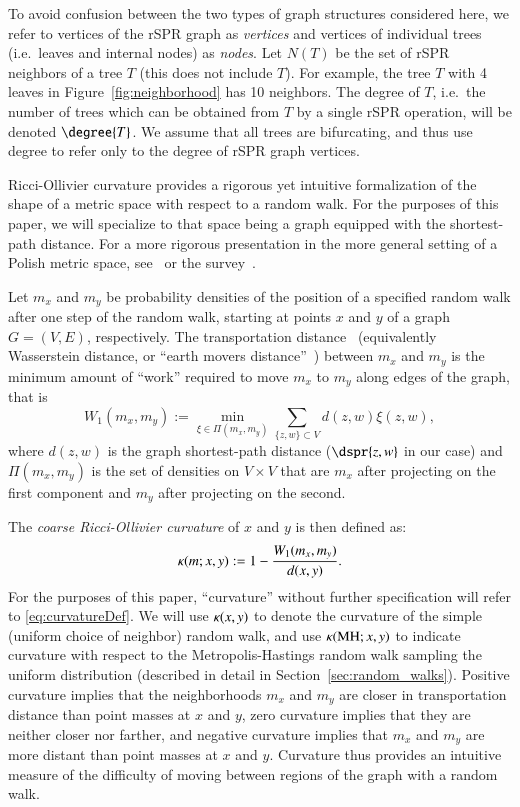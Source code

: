 \documentclass[]{elsarticle}
\newcommand{\MH}{\operatorname{MH}}
\newcommand{\curvature}[2][]{%
    \ifthenelse{\equal{#1}{}}%
		{\kappa(#2)}%
		{\kappa_{#1}(#2)}%
}
\begin{document}
To avoid confusion between the two types of graph structures considered here, we refer to vertices of the rSPR graph as \emph{vertices} and vertices of individual trees (i.e.\ leaves and internal nodes) as \emph{nodes}.
Let $N(T)$ be the set of rSPR neighbors of a tree $T$ (this does not include $T$).
For example, the tree $T$ with 4 leaves in Figure~\ref{fig:neighborhood} has 10 neighbors.
The degree of $T$, i.e.\ the number of trees which can be obtained from $T$ by a single rSPR operation, will be denoted $\degree{T}$.
We assume that all trees are bifurcating, and thus use degree to refer only to the degree of rSPR graph vertices.

Ricci-Ollivier curvature provides a rigorous yet intuitive formalization of the shape of a metric space with respect to a random walk.
For the purposes of this paper, we will specialize to that space being a graph equipped with the shortest-path distance.
For a more rigorous presentation in the more general setting of a Polish metric space, see~\citep{Ollivier2009-bw} or the survey~\citep{Ollivier2010-ao}.

Let $m_x$ and $m_y$ be probability densities of the position of a specified random walk after one step of the random walk, starting at points $x$ and $y$ of a graph $G = (V,E)$, respectively.
The transportation distance~\citep{Villani2003-wv} (equivalently Wasserstein distance, or ``earth movers distance''~\citep{rubner2000earth}) between $m_x$ and $m_y$ is the minimum amount of ``work'' required to move $m_x$ to $m_y$ along edges of the graph, that is
\vspace{-0.5em}
\begin{equation}
W_1(m_x, m_y) := \min_{\xi \in \Pi(m_x, m_y)} \sum_{\{z,w\} \subset V} d(z,w) \xi(z,w),
\end{equation}
where $d(z,w)$ is the graph shortest-path distance ($\dspr{z,w}$ in our case) and $\Pi(m_x, m_y)$ is the set of densities on $V \times V$ that are $m_x$ after projecting on the first component and $m_y$ after projecting on the second.

The \emph{coarse Ricci-Ollivier curvature} of $x$ and $y$ is then defined as:
\vspace{-0.5em}
\begin{equation}
\curvature{m; x, y} := 1 - \frac{W_1(m_x, m_y)}{d(x, y)}.
\label{eq:curvatureDef}
\end{equation}
For the purposes of this paper, ``curvature'' without further specification will refer to \eqref{eq:curvatureDef}.
We will use $\curvature{x,y}$ to denote the curvature of the simple (uniform choice of neighbor) random walk, and use $\curvature{\MH; x,y}$ to indicate curvature with respect to the Metropolis-Hastings random walk sampling the uniform distribution (described in detail in Section~\ref{sec:random_walks}).
Positive curvature implies that the neighborhoods $m_x$ and $m_y$ are closer in transportation distance than point masses at $x$ and $y$, zero curvature implies that they are neither closer nor farther, and negative curvature implies that $m_x$ and $m_y$ are more distant than point masses at $x$ and $y$.
Curvature thus provides an intuitive measure of the difficulty of moving between regions of the graph with a random walk.
\end{document}
